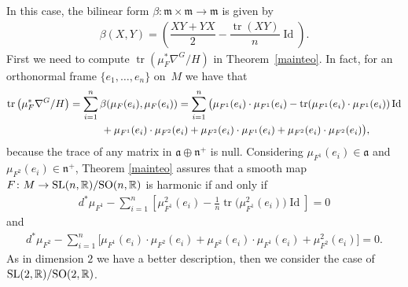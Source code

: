 \documentclass[10pt,a4paper]{amsart}
\numberwithin{equation}{section}
\newcommand{\m}{\mathfrak{m}}
\begin{document}
In this case, the bilinear form $\beta\colon \m \times \m \rightarrow \m$ is given by
\begin{gather}\label{fisherconnection}
  \beta(X,Y) = \left(\dfrac{XY+YX}{2} - \dfrac{\operatorname{tr}(XY)}{n}\operatorname{Id}\right).
\end{gather}
First we need to compute  $\operatorname{tr}(\mu_F^*\nabla^G/H)$ in Theorem~\ref{mainteo}. In fact, for an orthonormal frame $\{e_1,\ldots, e_n\}$ on~$M$  we have that
\begin{gather*}
  \operatorname{tr}\big(\mu_F^*\nabla^G/H\big)
    =   \sum_{i=1}^{n}\beta(\mu_F(e_i),\mu_F(e_i))
    =   \sum_{i=1}^{n}\big(\mu_{F^1}(e_i)\cdot \mu_{F^1}(e_i)  - {\rm tr}(\mu_{F^1}(e_i)\cdot \mu_{F^1}(e_i))\operatorname{Id}\\
  \hphantom{\operatorname{tr}\big(\mu_F^*\nabla^G/H\big)}{}
    +   \mu_{F^1}(e_i)\cdot\mu_{F^2}(e_i)+ \mu_{F^2}(e_i)\cdot\mu_{F^1}(e_i)+ \mu_{F^2}(e_i)\cdot\mu_{F^2}(e_i)\big),
\end{gather*}
because the trace of any matrix in $\mathfrak{a}\oplus
\mathfrak{n}^{+}$ is null. Considering $\mu_{F^1}(e_i) \in
\mathfrak{a}$ and $ \mu_{F^2}(e_i) \in \mathfrak{n}^{+}$, Theorem
\ref{mainteo} assures that a smooth map $F\colon M \rightarrow {\rm
SL}(n,{\mathbb R})/{\rm SO}(n,{\mathbb R})$ is harmonic if and only if
\begin{gather}
  d^*\mu_{F^1} - \sum_{i=1}^{n} \left[\mu_{F^1}^2(e_i) -\frac{1}{n}\operatorname{tr}\big(\mu_{F^1}^2(e_i)\big)\operatorname{Id}\right]   =   0 \label{equation1}
\end{gather}
and
\begin{gather}
  d^*\mu_{F^2} - \sum_{i=1}^{n} \big[\mu_{F^1}(e_i)\cdot\mu_{F^2}(e_i)+ \mu_{F^2}(e_i)\cdot\mu_{F^1}(e_i)+ \mu_{F^2}^2(e_i)\big]  =  0. \label{equation2}
\end{gather}
As in dimension $2$ we have a better description, then we consider
the case of ${\rm SL}(2,{\mathbb R})/{\rm SO}(2,{\mathbb R})$.
\end{document}
